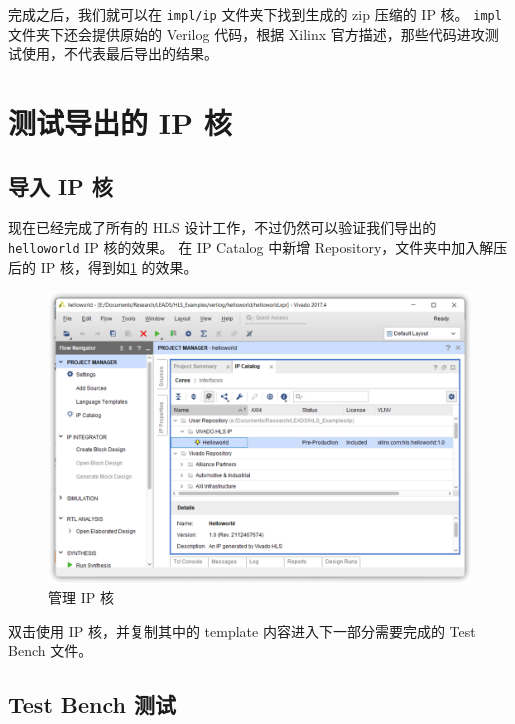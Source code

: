 \documentclass[Chinese,TC,use boldface,simple name]{beaulivre}
\begin{document}
    完成之后，我们就可以在 \texttt{impl/ip} 文件夹下找到生成的 zip 压缩的 IP 核。
    \texttt{impl} 文件夹下还会提供原始的 Verilog 代码，根据 Xilinx 官方描述，那些代码进攻测试使用，不代表最后导出的结果。

  \section{测试导出的 IP 核}

    \subsection{导入 IP 核}

      现在已经完成了所有的 HLS 设计工作，不过仍然可以验证我们导出的 \texttt{helloworld} IP 核的效果。
      在 IP Catalog 中新增 Repository，文件夹中加入解压后的 IP 核，得到如\cref{fig:manage_ip} 的效果。
      \begin{figure}[htbp]
        \centering
        \includegraphics[width=.8\linewidth]{win/helloworld/manage_ip.png}
        \caption{管理 IP 核}
        \label{fig:manage_ip}
      \end{figure}

      双击使用 IP 核，并复制其中的 template 内容进入下一部分需要完成的 Test Bench 文件。

    \subsection{Test Bench 测试}
\end{document}
